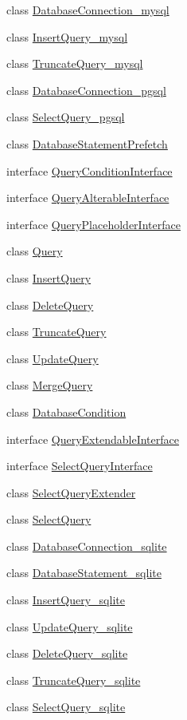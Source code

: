 \begin{DoxyCompactItemize}
\item 
class \hyperlink{classDatabaseConnection__mysql}{DatabaseConnection\_\-mysql}
\item 
class \hyperlink{classInsertQuery__mysql}{InsertQuery\_\-mysql}
\item 
class \hyperlink{classTruncateQuery__mysql}{TruncateQuery\_\-mysql}
\item 
class \hyperlink{classDatabaseConnection__pgsql}{DatabaseConnection\_\-pgsql}
\item 
class \hyperlink{classSelectQuery__pgsql}{SelectQuery\_\-pgsql}
\item 
class \hyperlink{classDatabaseStatementPrefetch}{DatabaseStatementPrefetch}
\item 
interface \hyperlink{interfaceQueryConditionInterface}{QueryConditionInterface}
\item 
interface \hyperlink{interfaceQueryAlterableInterface}{QueryAlterableInterface}
\item 
interface \hyperlink{interfaceQueryPlaceholderInterface}{QueryPlaceholderInterface}
\item 
class \hyperlink{classQuery}{Query}
\item 
class \hyperlink{classInsertQuery}{InsertQuery}
\item 
class \hyperlink{classDeleteQuery}{DeleteQuery}
\item 
class \hyperlink{classTruncateQuery}{TruncateQuery}
\item 
class \hyperlink{classUpdateQuery}{UpdateQuery}
\item 
class \hyperlink{classMergeQuery}{MergeQuery}
\item 
class \hyperlink{classDatabaseCondition}{DatabaseCondition}
\item 
interface \hyperlink{interfaceQueryExtendableInterface}{QueryExtendableInterface}
\item 
interface \hyperlink{interfaceSelectQueryInterface}{SelectQueryInterface}
\item 
class \hyperlink{classSelectQueryExtender}{SelectQueryExtender}
\item 
class \hyperlink{classSelectQuery}{SelectQuery}
\item 
class \hyperlink{classDatabaseConnection__sqlite}{DatabaseConnection\_\-sqlite}
\item 
class \hyperlink{classDatabaseStatement__sqlite}{DatabaseStatement\_\-sqlite}
\item 
class \hyperlink{classInsertQuery__sqlite}{InsertQuery\_\-sqlite}
\item 
class \hyperlink{classUpdateQuery__sqlite}{UpdateQuery\_\-sqlite}
\item 
class \hyperlink{classDeleteQuery__sqlite}{DeleteQuery\_\-sqlite}
\item 
class \hyperlink{classTruncateQuery__sqlite}{TruncateQuery\_\-sqlite}
\item 
class \hyperlink{classSelectQuery__sqlite}{SelectQuery\_\-sqlite}
\end{DoxyCompactItemize}
